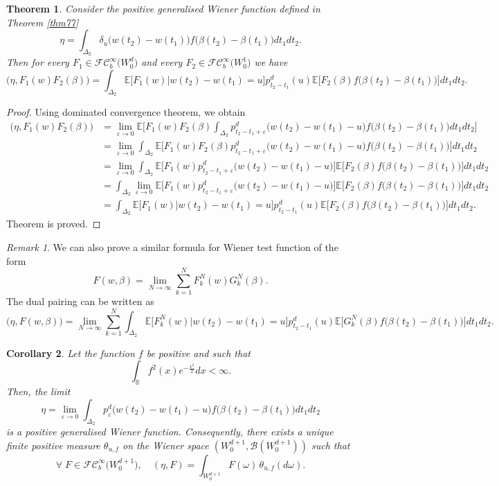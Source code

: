 \documentclass[]{interact}
\newcommand{\E}{{\mathbb{E}}}
\newcommand{\R}{{\mathbb{R}}}
\newcommand{\1}{\mathbf{1}}
\newcommand{\ve}{\varepsilon}
\theoremstyle{plain}%
\newtheorem{thm}{Theorem}[section]
\newtheorem{corollary}[thm]{Corollary}
\theoremstyle{definition}
\theoremstyle{remark}
\newtheorem{remark}{Remark}
\begin{document}
\begin{thm}\label{99}
Consider  the positive generalised Wiener function defined in Theorem \ref{thm77}
$$ \eta=\int _{\Delta_2} \delta_u \big(w(t_2)-w(t_1) \big) f\big( \beta(t_2)-\beta(t_1)\big ) dt_1dt_2 .$$
Then for every $F_1\in \mathcal{FC}_b^{\infty} \big( W_0^d \big)$ and every $F_2\in \mathcal{FC}_b^{\infty} \big( W_0^1 \big)$ we have 
$$ \big( \eta, F_1(w)F_2(\beta) \big) = \int_{\Delta_2  } \E \Big[F_1(w)\Big | w(t_2)-w(t_1)=u\Big]p_{t_2-t_1}^d(u)\E \Big[F_2(\beta)f\big( \beta(t_2)-\beta(t_1)\big )\Big] dt_1dt_2. $$
\end{thm}
 
\begin{proof}
Using dominated convergence theorem, we obtain
\begin{align*}
\big( \eta, F_1(w)F_2(\beta) \big)
&= \lim_{\ve \to 0} \E \Big[F_1(w)F_2(\beta)\int_{\Delta_2  } p_{t_2-t_1+\ve}^d\big(w(t_2)-w(t_1) -u\big) f\big( \beta(t_2)-\beta(t_1)\big ) dt_1dt_2\Big]\\
&= \lim_{\ve \to 0}\int_{\Delta_2  }  \E \Big[F_1(w)F_2(\beta)p_{t_2-t_1+\ve}^d\big(w(t_2)-w(t_1) -u\big) f\big( \beta(t_2)-\beta(t_1)\big )\Big] dt_1dt_2\\
&= \lim_{\ve \to 0}\int_{\Delta_2  }  \E \Big[F_1(w)p_{t_2-t_1+\ve}^d\big(w(t_2)-w(t_1) -u\big)\Big]  \E \Big[F_2(\beta)f\big( \beta(t_2)-\beta(t_1)\big )\Big] dt_1dt_2\\
&= \int_{\Delta_2  }  \lim_{\ve \to 0} \E \Big[F_1(w)p_{t_2-t_1+\ve}^d\big(w(t_2)-w(t_1) -u\big)\Big]  \E \Big[F_2(\beta)f\big( \beta(t_2)-\beta(t_1)\big )\Big] dt_1dt_2\\
&=\int_{\Delta_2  } \E \Big[F_1(w)\Big | w(t_2)-w(t_1)=u\Big]p_{t_2-t_1}^d(u)\E \Big[F_2(\beta)f\big( \beta(t_2)-\beta(t_1)\big )\Big] dt_1dt_2.
\end{align*}
Theorem is proved.
\end{proof}
 
\begin{remark} We can also prove a similar formula for Wiener test function of the form 
 $$ F(w,\beta)=\lim_{N\to\infty} \sum_{k=1}^N F_k^N(w) G_k^N(\beta).  $$
 The dual pairing can be written as 
 $$ \big( \eta, F(w,\beta) \big) =\lim_{N\to \infty} \sum_{k=1}^N  \int_{\Delta_2  } \E \Big[F_k^N(w)\Big | w(t_2)-w(t_1)=u\Big]p_{t_2-t_1}^d(u)\E \Big[G_k^N(\beta)f\big( \beta(t_2)-\beta(t_1)\big )\Big] dt_1dt_2.  $$
\end{remark}
 
\begin{corollary}\label{98}
Let the function $f$ be positive and such that 
$$ \int_{\R} f^2(x)e^{-\frac{x^2}{2}}dx <\infty. $$
Then, the limit
$$ 
\eta=\lim_{\varepsilon \to 0} \int_{\Delta_2  }  p^d_{\varepsilon}\big( w(t_2)-w(t_1)-u\big)f\big( \beta(t_2)-\beta(t_1)\big )    dt_1dt_2 $$
is a positive generalised Wiener function. Consequently, there exists a unique finite positive measure $\theta_{u,f}$ on the Wiener space $(W_0^{d+1},\mathcal{B}(W_0^{d+1}) )$ such that 
$$\forall \; F\in \mathcal{FC}_b^{\infty}\big( W_0^{d+1}\big),\quad (\eta, F)=\int_{ W_0^{d+1} }  F(\omega )\,\theta_{u,f}(d\omega).$$
\end{corollary} 
 
\end{document}
